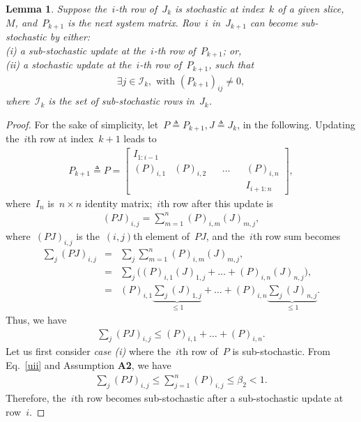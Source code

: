 \documentclass[draftclsnofoot, onecolumn, 12pt]{IEEEtran}
\newtheorem{lem}{Lemma}
\begin{document}
\begin{lem}\label{lem2}
Suppose the~$i$-th row of~$J_k$ is stochastic at index~$k$ of a given slice,~${{M}}$, and~$P_{k+1}$ is the next system matrix. Row~$i$ in~$J_{k+1}$ can become sub-stochastic by either:\\
(i) a sub-stochastic update at the~$i$-th row of~$P_{k+1}$; or,\\
(ii) a stochastic update at the~$i$-th row of~$P_{k+1}$, such that 
\begin{eqnarray*}
\exists j \in \mathcal{I}_k,\mbox{ with }(P_{k+1})_{ij} \neq 0,
\end{eqnarray*}
where~$\mathcal{I}_k$ is the set of sub-stochastic rows in~$J_k$.
\end{lem} 
\begin{proof}
For the sake of simplicity, let~$P \triangleq P_{k+1}, J \triangleq J_k$, in the following. Updating the~$i$th row at index~$k+1$ leads to
\begin{eqnarray}\label{16}
P_{k+1}\triangleq P=
\left[
\begin{array}{cccccc}
I_{1:i-1}\\
(P)_{i,1} & (P)_{i,2} && \ldots && (P)_{i,n}\\
&&&&& I_{i+1:n}
\end{array}
\right],
\end{eqnarray}
where~$I_n$ is~$n \times n$ identity matrix;~$i$th row after this update is
\begin{eqnarray*}
(PJ)_{i,j} = \sum_{m=1}^n(P)_{i,m}(J)_{m,j},
\end{eqnarray*}
where~$(PJ)_{i,j}$ is the~$(i,j)$th element of~$PJ$, and the~$i$th row sum becomes
\begin{eqnarray}\label{ui}
\sum_{j}(PJ)_{i,j}&=&\sum_{j}\sum_{m=1}^n(P)_{i,m}(J)_{m,j},\\
&=& \sum_{j} \Big((P)_{i,1}(J)_{1,j}+ \ldots + (P)_{i,n}(J)_{n,j} \Big),\nonumber\\
&=&(P)_{i,1}\underbrace{\sum_{j}(J)_{1,j}}_{\leq 1}+ \ldots + (P)_{i,n}\underbrace{\sum_{j}(J)_{n,j}}_{\leq 1}\nonumber.
\end{eqnarray}
Thus, we have
\begin{eqnarray}\label{uii}
\sum_{j}(PJ)_{i,j}\leq (P)_{i,1}+ \ldots + (P)_{i,n}.
\end{eqnarray}
Let us first consider \textit{case (i)} where the~$i$th row of~$P$ is sub-stochastic. From Eq.~\eqref{uii} and Assumption {\bf A2}, we have
\begin{eqnarray}\label{19}
\sum_{j}(PJ)_{i,j}\leq \sum_{j=1}^{n}(P)_{i,j} \leq\beta_2 < 1.
\end{eqnarray}
Therefore, the~$i$th row becomes sub-stochastic after a sub-stochastic update at row~$i$. 


\end{proof}
\end{document}

